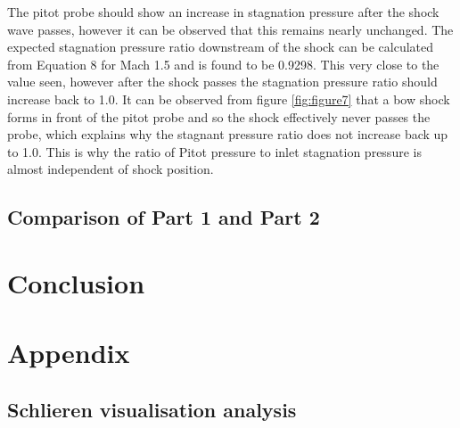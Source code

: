 \documentclass{article}
\begin{document}
The pitot probe should show an increase in stagnation pressure after the shock wave passes, however it can be observed that this remains nearly unchanged.
The expected stagnation pressure ratio downstream of the shock can be calculated from Equation 8 for Mach 1.5 and is found to be 0.9298. This very close to the value seen, however after the shock passes the stagnation pressure ratio should increase back to 1.0.
It can be observed from figure \ref{fig:figure7} that a bow shock forms in front of the pitot probe and so the shock effectively never passes the probe, which explains why the stagnant pressure ratio does not increase back up to 1.0.
This is why the ratio of Pitot pressure to inlet stagnation pressure is almost independent of shock position.

\subsection{Comparison of Part 1 and Part 2}


\section{Conclusion}


\newpage
\section{Appendix}

\subsection{Schlieren visualisation analysis}
\end{document}
